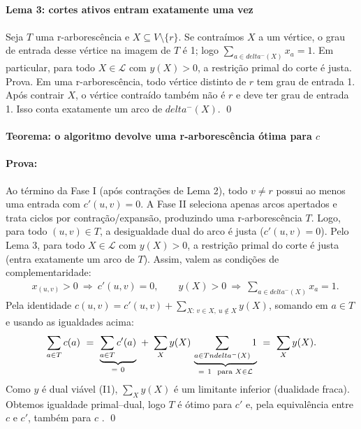 \documentclass[12pt,a4paper]{article}
\def\emph#1{#1}%
\def\cap{\string n}%
\def\delta{delta}%
\begin{document}
\paragraph{Lema 3: cortes ativos entram exatamente uma vez}
\paragraph{}
Seja \(T\) uma r-arborescência e \(X\subseteq V\setminus\{r\}\). Se contraímos \(X\) a um vértice, o grau de entrada desse vértice na imagem de \(T\) é 1; logo \(\sum_{a\in \delta^-(X)} x_a=1\). Em particular, para todo \(X\in\mathcal{L}\) com \(y(X)>0\), a restrição primal do corte é \emph{justa}.\newline
Prova. Em uma r-arborescência, todo vértice distinto de \(r\) tem grau de entrada 1. Após contrair \(X\), o vértice contraído também não é \(r\) e deve ter grau de entrada 1. Isso conta exatamente um arco de \(\delta^-(X)\). \qed

\paragraph{Teorema: o algoritmo devolve uma r-arborescência ótima para \(c\)}

\paragraph{Prova:}
Ao término da Fase I (após contrações de Lema 2), todo \(v\neq r\) possui ao menos uma entrada com \(c'(u,v)=0\). A Fase II seleciona apenas arcos \emph{apertados} e trata ciclos por contração/expansão, produzindo uma r-arborescência \(T\). Logo, para todo \((u,v)\in T\), a desigualdade dual do arco é \emph{justa} (\(c'(u,v)=0\)). Pelo Lema 3, para todo \(X\in\mathcal{L}\) com \(y(X)>0\), a restrição primal do corte é \emph{justa} (entra exatamente um arco de \(T\)). Assim, valem as condições de \emph{complementaridade}:
\begin{align*}
     & x_{(u,v)}>0\ \Rightarrow\ c'(u,v)=0,\qquad
    y(X)>0\ \Rightarrow\ \sum_{a\in \delta^-(X)} x_a=1.
\end{align*}
Pela identidade \(c(u,v)=c'(u,v)+\sum_{X:\,v\in X,\ u\notin X} y(X)\), somando em \(a\in T\) e usando as igualdades acima:
\[
    \sum_{a\in T} c(a)\ =\ \underbrace{\sum_{a\in T} c'(a)}_{=\ 0}\ +\ \sum_{X} y(X)\,\underbrace{\sum_{a\in T\cap \delta^-(X)} 1}_{=\ 1\ \text{ para } X\in\mathcal{L}}\ =\ \sum_{X} y(X).
\]
Como \(y\) é dual viável (I1), \(\sum_X y(X)\) é um limitante inferior (dualidade fraca). Obtemos igualdade primal–dual, logo \(T\) é ótimo para \(c'\) e, pela equivalência entre \(c\) e \(c'\), também para \(c\) \cite{frank2014,schrijver2003comb}. \qed
\end{document}
